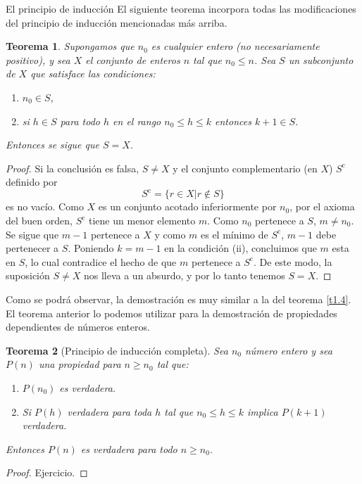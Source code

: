 \documentclass[11pt,spanish,makeidx]{amsbook}
\newtheorem{teorema}{Teorema}[section]
\theoremstyle{definition}
\theoremstyle{remark}
\begin{document}
\begin{section}{El principio de inducción}
El siguiente teorema incorpora todas las modificaciones del principio de inducción mencionadas más arriba.

\begin{teorema} Supongamos que $n_0$ es cualquier entero (no necesariamente positivo), y sea $X$ el conjunto de enteros $n$ tal que $ n_0 \le n$. Sea $S$ un subconjunto de $X$ que satisface las condiciones: 
\begin{enumerate}
\item[(i)] $n_0 \in S$,
\item[(ii)] si $h\in S$ para todo $h$ en el rango $n_0 \le h \le k$ entonces $k+1 \in S$.
\end{enumerate}
Entonces se sigue que $S=X$.
\end{teorema}
\begin{proof}
Si la conclusión es falsa, $S \not= X$ y el conjunto complementario (en $X$)  $S^{\text{c}}$ definido por
$$
S^{\text{c}}= \{ r \in X | r\not\in S\}
$$
es no vacío. Como $X$ es un conjunto acotado inferiormente por $n_0$, por el axioma del buen orden, $S^{\text{c}}$ tiene un menor elemento $m$. Como $n_0$ pertenece a $S$, $m\not=n_0$. Se sigue que $m-1$ pertenece a $X$ y como $m$ es el mínimo de $S^{\text{c}}$, $m-1$ debe pertenecer a $S$. Poniendo $k=m-1$ en la condición (ii), concluimos que $m$ esta en $S$, lo cual contradice el hecho de que $m$ pertenece a $S^{\text{c}}$. De este modo, la suposición $S \not= X$ nos lleva a un absurdo, y por lo tanto tenemos $S= X$.
\end{proof}

Como se podrá observar, la demostración es muy similar a  la del teorema \ref{t1.4}. El teorema anterior lo podemos utilizar para la demostración de propiedades dependientes de números enteros.

\begin{teorema}[Principio de inducción completa]\label{ind-completa} Sea $n_0$ número entero y sea $P(n)$ una propiedad para $n \ge n_0$ tal que:
\begin{enumerate}
\item[(1)] $P(n_0)$ es verdadera.
\item[(2)] Si $P(h)$ verdadera para toda $h$ tal que $n_0 \le h \le k$ implica $P(k + 1)$ verdadera.
\end{enumerate}
Entonces $P(n)$ es verdadera para todo $n \ge n_0$.
\end{teorema}
\begin{proof} Ejercicio.
\end{proof}


\end{section}
\end{document}
